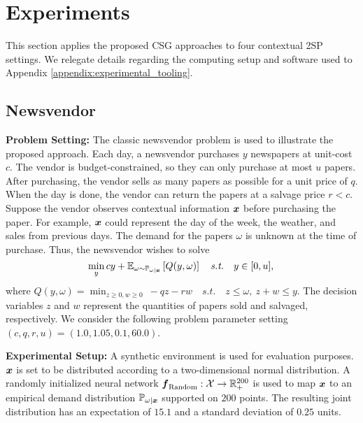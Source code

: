 \section{Experiments}\label{section:experiments}
This section applies the proposed CSG approaches to four contextual 2SP settings. We relegate details regarding the computing setup and software used to Appendix \ref{appendix:experimental_tooling}. 

\subsection{Newsvendor}

\textbf{Problem Setting:} The classic newsvendor problem is used to illustrate the proposed approach. Each day, a newsvendor purchases $y$ newspapers at unit-cost $c$. The vendor is budget-constrained, so they can only purchase at most $u$ papers. After purchasing, the vendor sells as many papers as possible for a unit price of $q$. When the day is done, the vendor can return the papers at a salvage price $r < c$. Suppose the vendor observes contextual information $\boldsymbol{x}$ before purchasing the paper. For example, $\boldsymbol{x}$ could represent the day of the week, the weather, and sales from previous days. The demand for the papers $\omega$ is unknown at the time of purchase. Thus, the newsvendor wishes to solve
    \begin{equation} \label{eq:newvendor}
    \min_{y} cy + \mathbb{E}_{\omega \sim \mathbb{P}_{\omega|\boldsymbol{x}}} \left[ Q(y, \omega)\right] \quad  \textit{s.t.} \quad  y \in [0, u],  \\
    \end{equation}
where $
        Q(y, \omega) = \min_{z \geq 0, w \geq 0} \ - q z - r w  \quad   \textit{s.t.} \quad z \leq \omega, \  z + w \leq y$. The decision variables $z$ and $w$ represent the quantities of papers sold and salvaged, respectively. We consider the following problem parameter setting $(c, q, r, u) = (1.0, 1.05, 0.1, 60.0)$. 

\vspace{\littlespace}
\noindent \textbf{Experimental Setup:}  A synthetic environment is used for evaluation purposes. $\boldsymbol{x}$ is set to be distributed according to a two-dimensional normal distribution. A randomly initialized neural network $\boldsymbol{f}_{\text{Random}} : \mathcal{X} \rightarrow \mathbb{R}_+^{200}$ is used to map $\boldsymbol{x}$ to an empirical demand distribution $\mathbb{P}_{\omega | \boldsymbol{x}}$ supported on $200$ points. The resulting joint distribution has an expectation of $15.1$ and a standard deviation of $0.25$ units.

